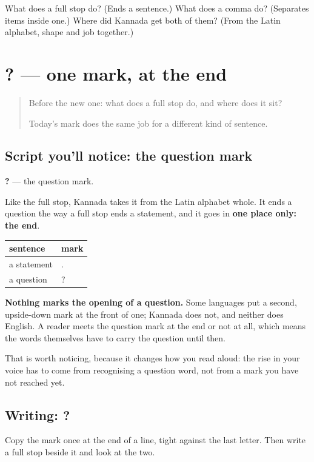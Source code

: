 \begin{tcolorbox}[breakable,colback=teal!4,colframe=teal!35!black,title={Before you move on}]
What does a full stop do? (Ends a sentence.) What does a comma do? (Separates items inside one.) Where did Kannada get both of them? (From the Latin alphabet, shape and job together.)
\end{tcolorbox}
\section[? (question mark)]{? — one mark, at the end}

\label{lesson:KA-S153-question-mark}



\begin{quote}
Before the new one: what does a full stop do, and where does it sit?

Today's mark does the same job for a different kind of sentence.
\end{quote}

\subsection*{Script you'll notice: the question mark}
\textbf{?} — the question mark.

Like the full stop, Kannada takes it from the Latin alphabet whole. It ends a question the way a full stop ends a statement, and it goes in \textbf{one place only: the end}.

\noindent
\begin{tabularx}{\linewidth}{@{}>{\raggedright\arraybackslash}X>{\raggedright\arraybackslash}X@{}}
\toprule
\textbf{sentence} & \textbf{mark} \\
\midrule
a statement & . \\
a question & ? \\
\bottomrule
\end{tabularx}

\textbf{Nothing marks the opening of a question.} Some languages put a second, upside-down mark at the front of one; Kannada does not, and neither does English. A reader meets the question mark at the end or not at all, which means the words themselves have to carry the question until then.

That is worth noticing, because it changes how you read aloud: the rise in your voice has to come from recognising a question word, not from a mark you have not reached yet.

\subsection*{Writing: ?}
Copy the mark once at the end of a line, tight against the last letter. Then write a full stop beside it and look at the two.

